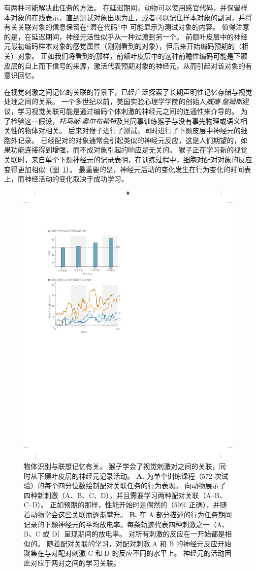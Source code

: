 有两种可能解决此任务的方法。
在延迟期间，动物可以使用感官代码，并保留样本对象的在线表示，直到测试对象出现为止，或者可以记住样本对象的副词，并将有关关联对象的信息保留在“潜在代码”中 可能显示为测试对象的内容。
值得注意的是，在延迟期间，神经元活性似乎从一种过渡到另一个。
前额叶皮层中的神经元最初编码样本对象的感觉属性（刚刚看到的对象），但后来开始编码预期的（相关）对象。 
正如我们将看到的那样，前额叶皮层中的这种前瞻性编码可能是下颞皮层的自上而下信号的来源，激活代表预期对象的神经元，从而引起对该对象的有意识回忆。


在视觉刺激之间记忆的关联的背景下，已经广泛探索了长期声明性记忆存储与视觉处理之间的关系。
一个多世纪以前，美国实验心理学学院的创始人\textit{威廉$\cdot$詹姆斯}建议，学习视觉关联可能是通过编码个体刺激的神经元之间的连通性来介导的。 为了检验这一假设，\textit{托马斯$\cdot$奥尔布赖特}及其同事训练猴子与没有事先物理或语义相关性的物体对相关。
后来对猴子进行了测试，同时进行了下颞皮层中神经元的细胞外记录。
已经配对的对象通常会引起类似的神经元反应，这是人们期望的，如果功能连接得到增强，而不成对象引起的响应是无关的。
猴子正在学习新的视觉关联时，来自单个下颞神经元的记录表明，在训练过程中，细胞对配对对象的反应变得更加相似（图~\ref{fig:24_12}）。
最重要的是，神经元活动的变化发生在行为变化的时间表上，而神经活动的变化取决于成功学习。


\begin{figure}[htbp]
	\centering
	\includegraphics[width=0.55\linewidth]{chap24/fig_24_12}
	\caption{物体识别与联想记忆有关。
		猴子学会了视觉刺激对之间的关联，同时从下颞叶皮层的神经元记录活动。
		\textbf{A.} 为单个训练课程（572 次试验）的每个四分位数绘制配对关联任务的行为表现。
		向动物展示了四种新刺激（A、B、C、D），并且需要学习两种配对关联（A–B、C–D）。
		正如预期的那样，性能开始时是偶然的（50\% 正确），并随着动物学会这些关联而逐渐攀升。
		\textbf{B.} 在 A 部分描述的行为任务期间记录的下颞神经元的平均放电率。每条轨迹代表四种刺激之一（A、B、C 或 D）呈现期间的放电率。
		对所有刺激的反应在一开始都是相似的。
		随着配对关联的学习，对配对刺激 A 和 B 的神经元反应开始聚集在与对配对刺激 C 和 D 的反应不同的水平上。
		神经元的活动因此对应于两对之间的学习关联。}
	\label{fig:24_12}
\end{figure}



